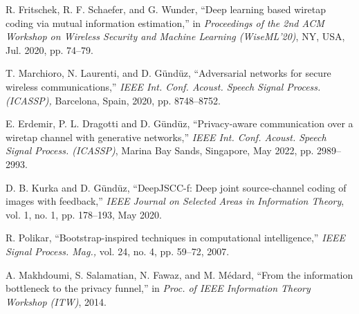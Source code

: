 \documentclass[conference]{IEEEtran}
\begin{document}
{{\begin{thebibliography}{10}
	
		
		R. Fritschek, R. F. Schaefer, and G. Wunder, 
		``Deep learning based wiretap coding via mutual information estimation,'' 
		in  \emph{Proceedings of the 2nd ACM Workshop on Wireless Security and Machine Learning (WiseML'20)}, 
		NY, USA, Jul. 2020, pp. 74--79.
	
		
		
		T. Marchioro, N. Laurenti, and D. Gündüz, ``Adversarial networks for secure wireless communications,'' \emph{IEEE Int. Conf.  Acoust. Speech  Signal Process. (ICASSP),} Barcelona, Spain, 2020, pp. 8748--8752. 
		
		
		E. Erdemir, P. L. Dragotti and D. Gündüz, ``Privacy-aware communication over a wiretap channel with generative networks,''  \emph{IEEE Int. Conf.  Acoust. Speech  Signal Process. (ICASSP)}, Marina Bay Sands, Singapore, May 2022, pp. 2989--2993.
	
	 	
		D. B. Kurka and D. Gündüz, ``DeepJSCC-f: Deep joint source-channel coding of images with feedback,'' \emph{IEEE
			Journal on Selected Areas in Information Theory}, vol. 1, no. 1, pp. 178--193, May 2020. 
		
		
		R. Polikar, ``Bootstrap-inspired techniques in computational intelligence,'' 
		\emph{IEEE Signal Process. Mag.,} vol. 24, no. 4, pp. 59--72, 2007.
	
	
		A. Makhdoumi, S. Salamatian, N. Fawaz, and M. Médard, ``From
		the information bottleneck to the privacy funnel,'' in \emph{Proc. of IEEE
			Information Theory Workshop (ITW)}, 2014.		
		
		

\end{thebibliography}}}
\end{document}
